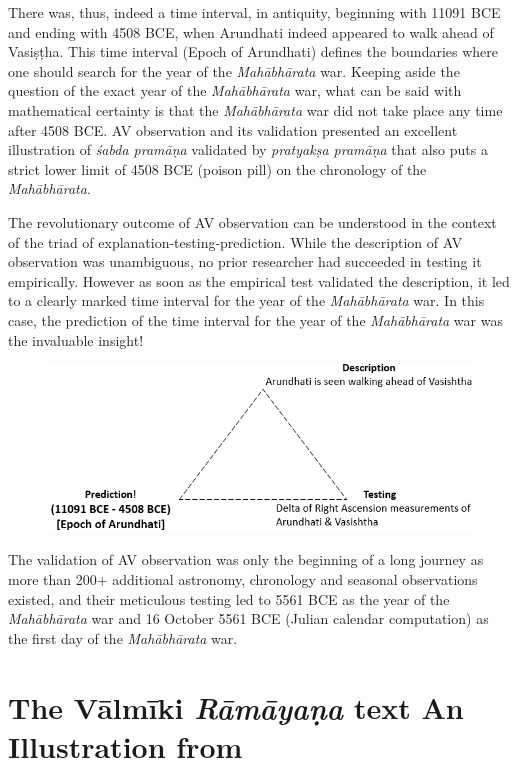 There was, thus, indeed a time interval, in antiquity, beginning with 11091 BCE and ending with 4508 BCE, when Arundhati indeed appeared to walk ahead of Vasiṣṭha. This time interval (Epoch of Arundhati) defines the boundaries where one should search for the year of the \textit{Mahābhārata} war. Keeping aside the question of the exact year of the \textit{Mahābhārata} war, what can be said with mathematical certainty is that the \textit{Mahābhārata} war did not take place any time after 4508 BCE. AV observation and its validation presented an excellent illustration of \textit{śabda pramāṇa} validated by \textit{pratyakṣa pramāṇa} that also puts a strict lower limit of 4508 BCE (poison pill) on the chronology of the \textit{Mahābhārata}.

The revolutionary outcome of AV observation can be understood in the context of the triad of explanation-testing-prediction. While the description of AV observation was unambiguous, no prior researcher had succeeded in testing it empirically. However as soon as the empirical test validated the description, it led to a clearly marked time interval for the year of the \textit{Mahābhārata} war. In this case, the prediction of the time interval for the year of the \textit{Mahābhārata} war was the invaluable insight!

\begin{figure}[!h]
\includegraphics[scale=.38]{images/chap2-9.jpg}
\end{figure}

The validation of AV observation was only the beginning of a long journey as more than 200+ additional astronomy, chronology and seasonal observations existed, and their meticulous testing led to 5561 BCE as the year of the \textit{Mahābhārata} war and 16 October 5561 BCE (Julian calendar computation) as the first day of the \textit{Mahābhārata} war.

\vspace{-.3cm}

\section*{The Vālmīki \textit{Rāmāyaṇa} text An Illustration from}

